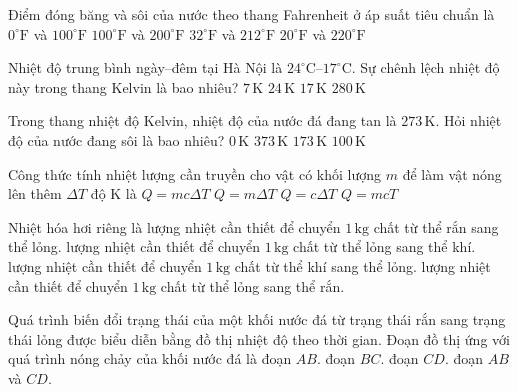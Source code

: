 \begin{ex}
Điểm đóng băng và sôi của nước theo thang Fahrenheit ở áp suất tiêu chuẩn là
\choice
{$0^\circ\mathrm{F}$ và $100^\circ\mathrm{F}$}
{$100^\circ\mathrm{F}$ và $200^\circ\mathrm{F}$}
{\True $32^\circ\mathrm{F}$ và $212^\circ\mathrm{F}$}
{$20^\circ\mathrm{F}$ và $220^\circ\mathrm{F}$}
\end{ex}


\begin{ex}
Nhiệt độ trung bình ngày--đêm tại Hà Nội là $24^\circ\mathrm{C}$--$17^\circ\mathrm{C}$. Sự chênh lệch nhiệt độ này trong thang Kelvin là bao nhiêu?
\choice
{\True $7\,\mathrm{K}$}
{$24\,\mathrm{K}$}
{$17\,\mathrm{K}$}
{$280\,\mathrm{K}$}
\end{ex}

\begin{ex}
Trong thang nhiệt độ Kelvin, nhiệt độ của nước đá đang tan là $273\,\mathrm{K}$. Hỏi nhiệt độ của nước đang sôi là bao nhiêu?
\choice
{$0\,\mathrm{K}$}
{\True $373\,\mathrm{K}$}
{$173\,\mathrm{K}$}
{$100\,\mathrm{K}$}
\end{ex}


\begin{ex}
Công thức tính nhiệt lượng cần truyền cho vật có khối lượng $m$ để làm vật nóng lên thêm $\Delta T$ độ K là
\choice
{\True $Q=mc\Delta T$}
{$Q=m\Delta T$}
{$Q=c\Delta T$}
{$Q=mcT$}
\end{ex}

\begin{ex}
Nhiệt hóa hơi riêng là
\choice
{lượng nhiệt cần thiết để chuyển $1\,\mathrm{kg}$ chất từ thể rắn sang thể lỏng.}
{\True lượng nhiệt cần thiết để chuyển $1\,\mathrm{kg}$ chất từ thể lỏng sang thể khí.}
{lượng nhiệt cần thiết để chuyển $1\,\mathrm{kg}$ chất từ thể khí sang thể lỏng.}
{lượng nhiệt cần thiết để chuyển $1\,\mathrm{kg}$ chất từ thể lỏng sang thể rắn.}
\end{ex}

\begin{ex}
Quá trình biến đổi trạng thái của một khối nước đá từ trạng thái rắn sang trạng thái lỏng được biểu diễn bằng đồ thị nhiệt độ theo thời gian. Đoạn đồ thị ứng với quá trình nóng chảy của khối nước đá là
\choice
{đoạn $AB$.}
{\True đoạn $BC$.}
{đoạn $CD$.}
{đoạn $AB$ và $CD$.}
\end{ex}

